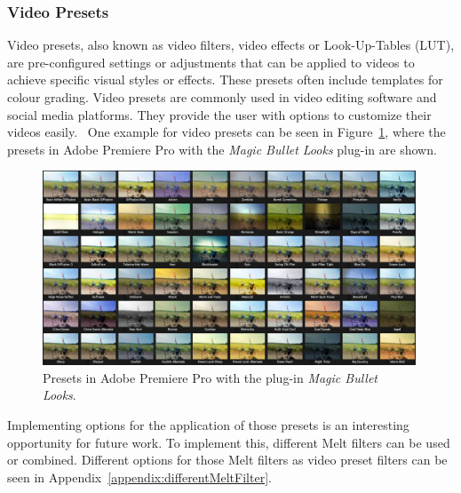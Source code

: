 \documentclass[../MasterThesis.tex]{subfiles}
\begin{document}
\subsubsection*{Video Presets}

Video presets, also known as video filters, video effects or Look-Up-Tables (LUT), are pre-configured settings or adjustments that can be applied to videos to achieve specific visual styles or effects. 
These presets often include templates for colour grading. 
Video presets are commonly used in video editing software and social media platforms. They provide the user with options to customize their videos easily.~\cite{cc1}
%
One example for video presets can be seen in Figure~\ref{figure:app}, where the presets in Adobe Premiere Pro with the \textit{Magic Bullet Looks} plug-in are shown.~\cite{premierepro, magicbullet}

\begin{figure}[H]
	
	\centering
	
	\includegraphics[width=0.99\textwidth]{app.png}
	
	\caption[Presets in Adobe Premiere Pro (\textit{Magic Bullet Looks}).]{Presets in Adobe Premiere Pro with the plug-in \textit{Magic Bullet Looks}.~\cite{premierepro, magicbullet}}
	\label{figure:app}
	
\end{figure}

Implementing options for the application of those presets is an interesting opportunity for future work. To implement this, different Melt filters can be used or combined. Different options for those Melt filters as video preset filters can be seen in Appendix~\ref{appendix:differentMeltFilter}.
\end{document}
